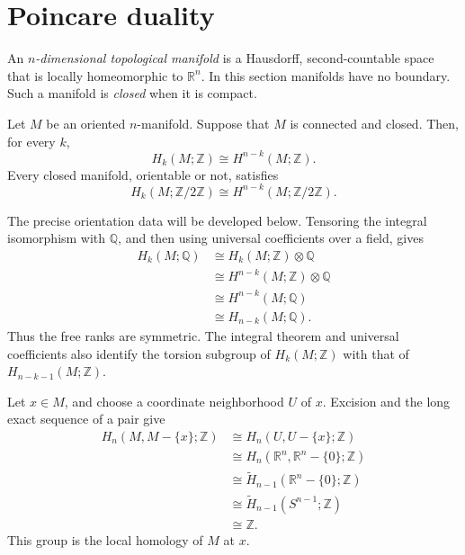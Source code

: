 \section{Poincare duality}
\label{section-poincare-duality}

\begin{definition}
\label{at-definition-topological-manifold}
An \emph{$n$-dimensional topological
manifold} is a Hausdorff,
second-countable space that is locally
homeomorphic to $\mathbb{R}^n$.  In this
section manifolds have no boundary.  Such a
manifold is \emph{closed} when it is
compact.
\end{definition}

\begin{theorem}
\label{at-theorem-poincare-integral}
Let $M$ be an oriented $n$-manifold.
Suppose that $M$ is connected and closed.
Then, for every $k$,
$$
H_k(M;\mathbb{Z})
\cong H^{n-k}(M;\mathbb{Z}).
$$
Every closed manifold, orientable or not,
satisfies
$$
H_k(M;\mathbb{Z}/2\mathbb{Z})
\cong
H^{n-k}(M;\mathbb{Z}/2\mathbb{Z}).
$$
\end{theorem}

\noindent
The precise orientation data will be
developed below.  Tensoring the integral
isomorphism with $\mathbb{Q}$, and then
using universal coefficients over a field,
gives
$$
\begin{aligned}
H_k(M;\mathbb{Q})
&\cong H_k(M;\mathbb{Z})
  \otimes\mathbb{Q} \\
&\cong H^{n-k}(M;\mathbb{Z})
  \otimes\mathbb{Q} \\
&\cong H^{n-k}(M;\mathbb{Q}) \\
&\cong H_{n-k}(M;\mathbb{Q}).
\end{aligned}
$$
Thus the free ranks are symmetric.  The
integral theorem and universal coefficients
also identify the torsion subgroup of
$H_k(M;\mathbb{Z})$ with that of
$H_{n-k-1}(M;\mathbb{Z})$.

\noindent
Let $x\in M$, and choose a coordinate
neighborhood $U$ of $x$.  Excision and the
long exact sequence of a pair give
$$
\begin{aligned}
H_n(M,M-\{x\};\mathbb{Z})
&\cong H_n(U,U-\{x\};\mathbb{Z}) \\
&\cong H_n(\mathbb{R}^n,
  \mathbb{R}^n-\{0\};\mathbb{Z}) \\
&\cong \widetilde H_{n-1}
  (\mathbb{R}^n-\{0\};\mathbb{Z}) \\
&\cong \widetilde H_{n-1}
  (S^{n-1};\mathbb{Z}) \\
&\cong\mathbb{Z}.
\end{aligned}
$$
This group is the local homology of $M$ at
$x$.

